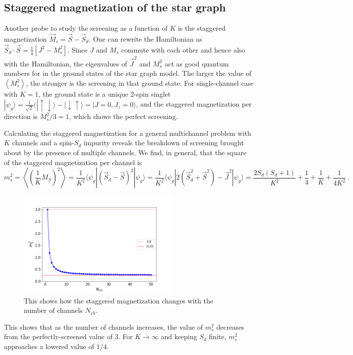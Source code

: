 \documentclass[reprint,onecolumn,prb,superscriptaddress]{revtex4-2}
\begin{document}
\subsection{Staggered magnetization of the star graph}
 Another probe to study the screening as a function of \(K\) is the staggered magnetization \(\vec{M}_s=\vec{S}-\vec{S}_d\). One can rewrite the Hamiltonian as $\vec{S}_d\cdot\vec{S}= \frac{1}{4}[J^2 - M_s^2]$. Since \(J\) and \(M_s\) commute with each other and hence also with the Hamiltonian, the eigenvalues of $\vec{J}^2$ and \(M_s^2\) act as good quantum numbers for in the ground states of the star graph model. The larger the value of \(\left<M_s^2\right>\), the stronger is the screening in that ground state. For single-channel case with $K=1$, the ground state is a unique 2-spin singlet $|\psi_g\rangle =\frac{1}{\sqrt{2}} (|\uparrow\downarrow\rangle-|\downarrow\uparrow\rangle = |J=0,J_z=0\rangle$, and the staggered magnetization per direction is \(M_s^2/3 = 1\), which shows the perfect screening.

Calculating the staggered magnetization for a general multichannel problem with \(K\) channels and a spin-\(S_d\) impurity reveals the breakdown of screening brought about by the presence of multiple channels. We find, in general, that the square of the staggered magnetization per channel is
\begin{equation}
	m_s^2 = \left< \left(\frac{1}{K}M_S\right)^2\right> = \frac{1}{K^2}\langle \psi_g | (\vec{S}_d - \vec{S})^2 |\psi_g\rangle = \frac{1}{K^2}\langle \psi_g | 2(\vec{S}_d^2 + \vec{S}^2)-\vec{J}^2 |\psi_g\rangle = \frac{2S_d(S_d+1)}{K^2}+\frac{1}{4}+\frac{1}{K}+\frac{1}{4K^2}~.
\end{equation}

\begin{figure}
\includegraphics[width=0.7\textwidth]{plt/Staggeredmag50.png}
\caption{This shows how the staggered magnetization changes with the number of channels $N_{ch}$.}
\label{fig:st_mag}
\end{figure}
This shows that as the number of channels increases, the value of \(m_s^2\) decreases from the perfectly-screened value of 3. For \(K \to \infty\) and keeping \(S_d\) finite, \(m_s^2\) approaches a lowered value of \(1/4\).
\end{document}

